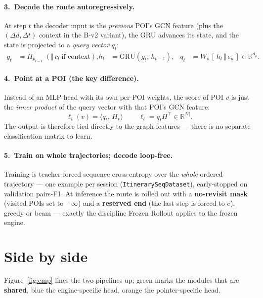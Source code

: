 \documentclass[11pt]{article}
\newcommand{\shared}{\textcolor{svGreen}{\textbf{shared}}}
\begin{document}
\paragraph{3.\ Decode the route autoregressively.}
At step $t$ the decoder input is the \emph{previous} POI's GCN feature (plus the
$(\Delta d,\Delta t)$ context in the B-v2 variant), the GRU advances its state, and the state is
projected to a \emph{query vector} $q_t$:
\begin{align}
g_t &= H_{p_{t-1}}\;(\Vert\,c_t\ \text{if context}), &
h_t &= \mathrm{GRU}(g_t,\,h_{t-1}), &
q_t &= W_o\,[\,h_t\,\Vert\,e_u\,]\in\mathbb{R}^{d_p}.
\end{align}

\paragraph{4.\ Point at a POI (the key difference).}
Instead of an MLP head with its own per-POI weights, the score of POI $v$ is just the
\emph{inner product} of the query vector with that POI's GCN feature:
\begin{equation}
\boxed{\ \ell_t(v) = \langle q_t,\,H_v\rangle\ }\qquad \ell_t = q_t H^\top \in\mathbb{R}^{|V|}.
\end{equation}
The output is therefore tied directly to the graph features --- there is no separate classification
matrix to learn.

\paragraph{5.\ Train on whole trajectories; decode loop-free.}
Training is teacher-forced sequence cross-entropy over the \emph{whole} ordered trajectory --- one
example per session (\texttt{ItinerarySeqDataset}), early-stopped on validation pairs-F1. At
inference the route is rolled out with a \textbf{no-revisit mask} (visited POIs set to $-\infty$) and
a \textbf{reserved end} (the last step is forced to $e$), greedy or beam --- exactly the discipline
Frozen Rollout applies to the frozen engine.



\section{Side by side}

Figure~\ref{fig:cmp} lines the two pipelines up; \textcolor{svGreen}{green} marks the modules that are
\shared, \textcolor{svBlue}{blue} the engine-specific head, \textcolor{svOrange}{orange} the
pointer-specific head.
\end{document}

